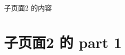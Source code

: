 \documentclass[UTF8]{ctexart}
\begin{document}
	
	子页面2 的内容
	
	\part{子页面2 的 part 1}
	
\end{document}
